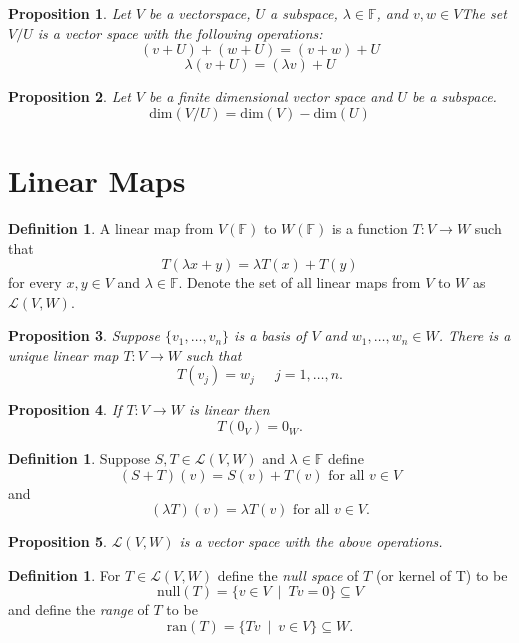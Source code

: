 \documentclass[12pt,letterpaper]{amsart}
\theoremstyle{plain}
\newtheorem{proposition}{Proposition}[section]
\theoremstyle{definition}
\newtheorem{definition}[theorem]{Definition}
\numberwithin{equation}{section}
\begin{document}
\begin{proposition} Let $V$ be a vectorspace, $U$ a subspace, $\lambda\in \mathbb{F}$, and $v,w\in V$The set $V/U$ is a vector space with the following operations: 
\[(v+U)+(w+U)=(v+w)+U\]
\[\lambda(v+U)=(\lambda v)+U\]
\end{proposition}


\begin{proposition} Let $V$ be a finite dimensional vector space and $U$ be a subspace. 
\[\text{dim}(V/U)=\text{dim}(V)-\text{dim}(U)\]
\end{proposition}

\section{Linear Maps}
\begin{definition} A linear map from $V(\mathbb{F})$ to $W(\mathbb{F})$ is a function $T:V\rightarrow W$ such that 
\[T(\lambda x+y)=\lambda T(x)+T(y)\]
for every $x,y\in V$ and $\lambda\in \mathbb{F}$. Denote the set of all linear maps from $V$ to $W$ as $\mathcal{L}(V,W)$. 
\end{definition}
\begin{proposition} Suppose $\{v_1,\ldots, v_n\}$ is a basis of $V$ and $w_1,\ldots,w_n\in W$. There is a unique linear map $T:V\rightarrow W$ such that 
\[T(v_j)=w_j\ \quad \ j=1,\ldots, n.\]
\end{proposition}

\begin{proposition} If $T:V\rightarrow W$ is linear then 
\[T(0_V)=0_W.\]
\end{proposition}

\begin{definition} Suppose $S, T\in \mathcal{L}(V,W)$ and $\lambda \in \mathbb{F}$ define 
\[(S+T)(v)=S(v)+T(v) \text{ for all }v\in V\]
and
\[(\lambda T)(v)=\lambda T(v) \text{ for all }v\in V.\]
\end{definition}
\begin{proposition} $\mathcal{L}(V,W)$ is a vector space with the above operations.
\end{proposition}

\begin{definition} For $T\in \mathcal{L}(V,W)$ define the \emph{null space} of $T$ (or kernel of T) to be 
\[\text{null}(T)=\{v\in V\ \mid \  Tv=0\}\subseteq V\]
and define the \emph{range} of $T$ to be 
\[\text{ran}(T)=\{Tv\ \mid \  v\in V\}\subseteq W.\]
\end{definition}
\end{document}
